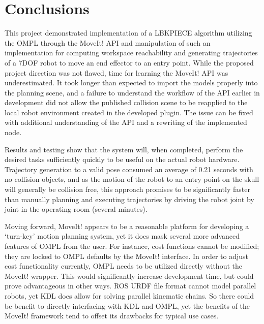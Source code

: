 \documentclass[12pt]{report}
\begin{document}
\chapter{Conclusions}
This project demonstrated implementation of a LBKPIECE algorithm utilizing the OMPL through the MoveIt! API and manipulation of such an implementation for computing workspace reachability and generating trajectories of a 7DOF robot to move an end effector to an entry point. While the proposed project direction was not flawed, time for learning the MoveIt! API was underestimated. It took longer than expected to import the models properly into the planning scene, and a failure to understand the workflow of the API earlier in development did not allow the published collision scene to be reapplied to the local robot environment created in the developed plugin. The issue can be fixed with additional understanding of the API and a rewriting of the implemented node.

Results and testing show that the system will, when completed, perform the desired tasks sufficiently quickly to be useful on the actual robot hardware. Trajectory generation to a valid pose consumed an average of 0.21 seconds with no collision objects, and as the motion of the robot to an entry point on the skull will generally be collision free, this approach promises to be significantly faster than manually planning and executing trajectories by driving the robot joint by joint in the operating room (several minutes). 

Moving forward, MoveIt! appears to be a reasonable platform for developing a `turn-key' motion planning system, yet it does mask several more advanced features of OMPL from the user. For instance, cost functions cannot be modified; they are locked to OMPL defaults by the MoveIt! interface. \cite{moveitIssue} In order to adjust cost functionality currently, OMPL needs to be utilized directly without the MoveIt! wrapper. This would significantly increase development time, but could prove advantageous in other ways. ROS URDF file format cannot model parallel robots, yet KDL does allow for solving parallel kinematic chains. \cite{kdl} So there could be benefit to directly interfacing with KDL and OMPL, yet the benefits of the MoveIt! framework tend to offset its drawbacks for typical use cases.

\end{document}
